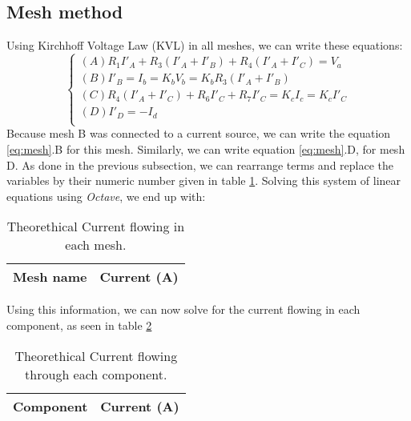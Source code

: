 \subsection{Mesh method}
Using Kirchhoff Voltage Law (KVL) in all meshes, we can write these equations:
\begin{equation}\label{eq:mesh}
\begin{cases}
  (A) R_1I'_A + R_3(I'_A + I'_B) + R_4(I'_A + I'_C) = V_a \\
  (B) I'_B = I_b = K_bV_b = K_bR_3(I'_A + I'_B) \\
  (C) R_4(I'_A+I'_C) + R_6I'_C + R_7I'_C = K_cI_c = K_cI'_C \\
  (D) I'_D = -I_d \\
\end{cases}
\end{equation}
Because mesh B was connected to a current source, we can write the equation \ref{eq:mesh}.B for this mesh. Similarly, we can write equation \ref{eq:mesh}.D, for mesh D. As done in the previous subsection, we can rearrange terms and replace the variables by their numeric number given in table \ref{tab:mesh}. Solving this system of linear equations using \textit{Octave}, we end up with:
\begin{table}[H]
  \centering
  \begin{tabular}{|l|r|}
    \hline
        {\bf Mesh name} & {\bf Current (A)} \\ \hline
        
  \end{tabular}
  \caption{Theorethical Current flowing in each mesh.}
  \label{tab:mesh}
\end{table}
Using this information, we can now solve for the current flowing in each component, as seen in table \ref{tab:comp}
\begin{table}[H]
  \centering
  \begin{tabular}{|l|r|}
    \hline
        {\bf Component} & {\bf Current (A)} \\ \hline
        
  \end{tabular}
  \caption{Theorethical Current flowing through each component.}
  \label{tab:comp}
\end{table}
\par



